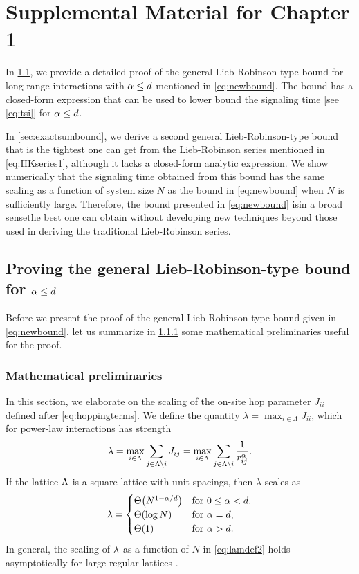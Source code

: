 \chapter{Supplemental Material for Chapter 1}
\label{app:vlr}
In \cref{sec:generalbound}, we provide a detailed proof of the general Lieb-Robinson-type bound for long-range interactions with $\alpha\le d$ mentioned in \cref{eq:newbound}. The bound has a closed-form expression that can be used to lower bound the signaling time [see \cref{eq:tsi}] for $\alpha \le d$.

In \cref{sec:exactsumbound}, we derive a second general Lieb-Robinson-type bound that is the tightest one can get from the Lieb-Robinson series mentioned in \cref{eq:HKseries1}, although it lacks a closed-form analytic expression.
We show numerically that the signaling time obtained from this bound has the same scaling as a function of system size $N$ as the bound in \cref{eq:newbound} when $N$ is sufficiently large.
Therefore, the bound presented in \cref{eq:newbound} is\dash in a broad sense\dash the best one can obtain without developing new techniques beyond those used in deriving the traditional Lieb-Robinson series.

\section{Proving the general Lieb-Robinson-type bound for \texorpdfstring{$\alpha \le d$}{α <= d}}
\label{sec:generalbound}
Before we present the proof of the general Lieb-Robinson-type bound given in \cref{eq:newbound}, let us summarize in \cref{sec:math} some mathematical preliminaries useful for the proof.

\subsection{Mathematical preliminaries}
\label{sec:math}
In this section, we elaborate on the scaling of the on-site hop parameter $J_{ii}$ defined after \cref{eq:hoppingterms}.
We define the quantity $\lambda = \max_{i\in\Lambda} J_{ii}$, which for power-law interactions has strength
\begin{equation}
	\label{eq:self-hop}
	\lambda = \max_{i\in\Lambda} \sum_{j\in\Lambda\backslash i} J_{ij} = \max_{i\in\Lambda}\sum_{j\in\Lambda\backslash i} \frac{1}{r_{ij}^{\alpha}}.
\end{equation}
If the lattice $\Lambda$ is a square lattice with unit spacings, then $\lambda$ scales as
\begin{equation}
        \label{eq:lamdef2}
	\lam = \begin{cases}
        \Th{N^{1-\al/d}} & \text{for }0\le\al<d,\\
        \Th{\log N} & \text{for }\al=d,\\
        \Th 1 & \text{for }\al>d.
\end{cases}
\end{equation}
In general, the scaling of $\lambda$ as a function of $N$ in \cref{eq:lamdef2} holds asymptotically for large regular lattices \cite{Storch15}.

